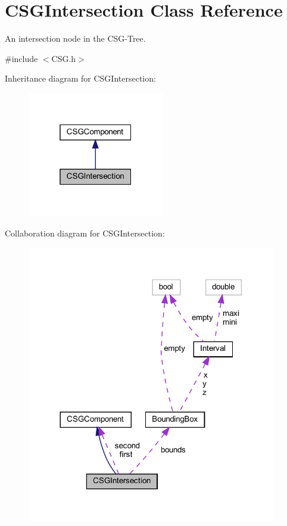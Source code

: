 \hypertarget{classCSGIntersection}{}\section{C\+S\+G\+Intersection Class Reference}
\label{classCSGIntersection}


An intersection node in the C\+S\+G-\/\+Tree.  




{\ttfamily \#include $<$C\+S\+G.\+h$>$}



Inheritance diagram for C\+S\+G\+Intersection\+:
\nopagebreak
\begin{figure}[H]
\begin{center}
\leavevmode
\includegraphics[width=169pt]{classCSGIntersection__inherit__graph}
\end{center}
\end{figure}


Collaboration diagram for C\+S\+G\+Intersection\+:
\nopagebreak
\begin{figure}[H]
\begin{center}
\leavevmode
\includegraphics[width=308pt]{classCSGIntersection__coll__graph}
\end{center}
\end{figure}
